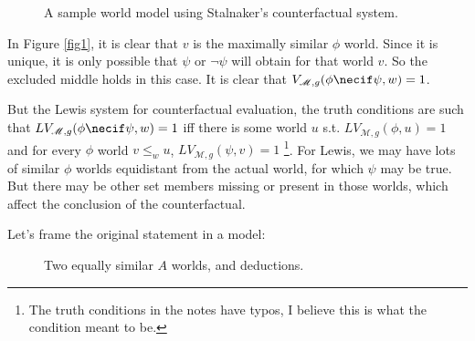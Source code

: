 \documentclass{article}
\begin{document}
        \begin{figure}[H]
            
            \begin{center}
            \end{center}
        \caption{A sample world model using Stalnaker's counterfactual system.}
        \end{figure}\label{fig1}
        
        In Figure \ref{fig1}, it is clear that $v$ is the maximally similar $\phi$ world. Since it is unique, it is only possible that $\psi$ or $\lnot \psi$ will obtain for that world $v$. 
        So the excluded middle holds in this case. It is clear that $V_{\mathscr{M}, g}(\phi \necif \psi, w) = 1$. 

        But the Lewis system for counterfactual evaluation, the truth conditions are such that $LV_{\mathscr{M}, g}(\phi \necif \psi, w) = 1$ 
        iff there is some world $u$ s.t. $LV_{\mathscr{M},g}(\phi, u) = 1$ and for every $\phi$ world $v \leq_w u$, $LV_{\mathscr{M}, g}(\psi , v) = 1$ \footnote{The truth conditions in the notes have typos, I believe this is what the condition meant to be.}.
        For Lewis, we may have lots of similar $\phi$ worlds equidistant from the actual world, for which $\psi$ may be true. But there may be other set members missing or present in those worlds, which affect the conclusion of the counterfactual.

        Let's frame the original statement in a model: 

        \begin{figure}[H]
            \begin{center}
            \end{center}
            \caption{Two equally similar $A$ worlds, and deductions.}
        \end{figure}\label{fig2}
\end{document}
